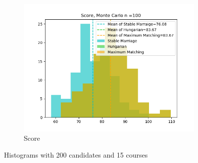\documentclass[twoside,twocolumn]{article}
\begin{document}
\begin{figure}[t]
        ~
        \begin{subfigure}{0.32\textwidth}
            \centering
            \includegraphics[width=\textwidth]{../figures/200candidates_15courses_100simulations/scores.png}
            \caption{Score}
        \end{subfigure}
        \caption{Histograms with 200 candidates and 15 courses}
        \label{fig:200can_15cou}
    \end{figure}
\end{document}
